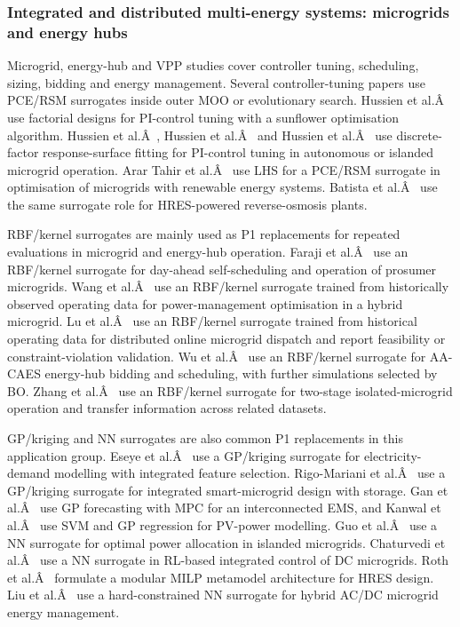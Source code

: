 \documentclass[final,5p,times,twocolumn]{elsarticle}
\begin{document}
\subsubsection{Integrated and distributed multi-energy systems: microgrids and energy hubs}
\label{sec:apps:microgrid}

Microgrid, energy-hub and VPP studies cover controller tuning,
scheduling, sizing, bidding and energy management. Several
controller-tuning papers use PCE/RSM surrogates inside outer MOO or
evolutionary search. Hussien et al.Â~\cite{Hussien20211883} use factorial
designs for PI-control tuning with a sunflower optimisation algorithm.
Hussien et al.Â~\cite{Hussien20226442}, Hussien et al.Â~\cite{Hussien202190577}
and Hussien et al.Â~\cite{Hussien202415075} use discrete-factor
response-surface fitting for PI-control tuning in autonomous or islanded
microgrid operation. Arar Tahir et al.Â~\cite{arar_tahir_scientific_2023} use
LHS for a PCE/RSM surrogate in optimisation of microgrids with renewable
energy systems. Batista et al.Â~\cite{batista_optimizing_2023} use the same
surrogate role for HRES-powered reverse-osmosis plants.

RBF/kernel surrogates are mainly used as P1 replacements for repeated
evaluations in microgrid and energy-hub operation. Faraji et
al.Â~\cite{Faraji2020157284} use an RBF/kernel surrogate for day-ahead
self-scheduling and operation of prosumer microgrids. Wang et
al.Â~\cite{Wang20192635} use an RBF/kernel surrogate trained from
historically observed operating data for power-management optimisation
in a hybrid microgrid. Lu et al.Â~\cite{Lu20232989} use an RBF/kernel
surrogate trained from historical operating data for distributed online
microgrid dispatch and report feasibility or constraint-violation
validation. Wu et al.Â~\cite{Wu2021} use an RBF/kernel surrogate for AA-CAES
energy-hub bidding and scheduling, with further simulations selected by
BO. Zhang et al.Â~\cite{Zhang20203731} use an RBF/kernel surrogate for
two-stage isolated-microgrid operation and transfer information across
related datasets.

GP/kriging and NN surrogates are also common P1 replacements in this
application group. Eseye et al.Â~\cite{Eseye201991463} use a GP/kriging
surrogate for electricity-demand modelling with integrated feature
selection. Rigo-Mariani et al.Â~\cite{Rigo-Mariani20171762} use a GP/kriging
surrogate for integrated smart-microgrid design with storage. Gan et
al.Â~\cite{Gan2021695} use GP forecasting with MPC for an interconnected EMS,
and Kanwal et al.Â~\cite{Kanwal2018117} use SVM and GP regression for
PV-power modelling. Guo et al.Â~\cite{Guo20222057} use a NN surrogate for
optimal power allocation in islanded microgrids. Chaturvedi et
al.Â~\cite{Chaturvedi2024149} use a NN surrogate in RL-based integrated
control of DC microgrids. Roth et al.Â~\cite{Roth2019214} formulate a
modular MILP metamodel architecture for HRES design. Liu et
al.Â~\cite{Liu20242534} use a
hard-constrained NN surrogate for hybrid AC/DC microgrid energy
management.
\end{document}
